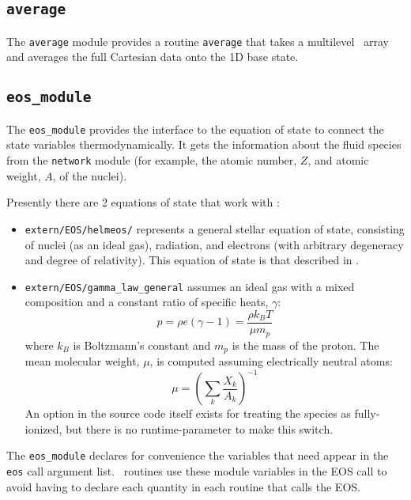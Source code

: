 \subsection{\tt average}

The {\tt average} module provides a routine {\tt average} that takes
a multilevel \multifab\ array and averages the full Cartesian data
onto the 1D base state.

\subsection{{\tt eos\_module}}

The {\tt eos\_module} provides the interface to the equation of 
state to connect the state variables thermodynamically.  It 
gets the information about the fluid species from the {\tt network}
module (for example, the atomic number, $Z$, and atomic weight, $A$,
of the nuclei).

Presently there are 2 equations of state that work with \maestro:
\begin{itemize}
\item {\tt extern/EOS/helmeos/} represents a general stellar equation 
      of state, consisting of nuclei (as an ideal gas), radiation,
      and electrons (with arbitrary degeneracy and degree of relativity).
      This equation of state is that described in \cite{timmes_eos}.

\item {\tt extern/EOS/gamma\_law\_general} assumes an ideal gas with a mixed 
     composition and a constant ratio of specific heats, $\gamma$:
      \begin{equation}
      p = \rho e (\gamma - 1) = \frac{\rho k_B T}{\mu m_p} 
      \end{equation}
     where $k_B$ is Boltzmann's constant and $m_p$ is the mass of the
     proton.
     The mean molecular weight, $\mu$, is computed assuming 
     electrically neutral atoms:
     \begin{equation}
     \mu = \left ( \sum_k \frac{X_k}{A_k} \right )^{-1}
     \end{equation}
     An option in the source code itself exists for treating the
     species as fully-ionized, but there is no runtime-parameter to
     make this switch.
\end{itemize}

The {\tt eos\_module} declares for convenience the variables that need
appear in the {\tt eos} call argument list.  \maestro\ routines use
these module variables in the EOS call to avoid having to declare 
each quantity in each routine that calls the EOS.

